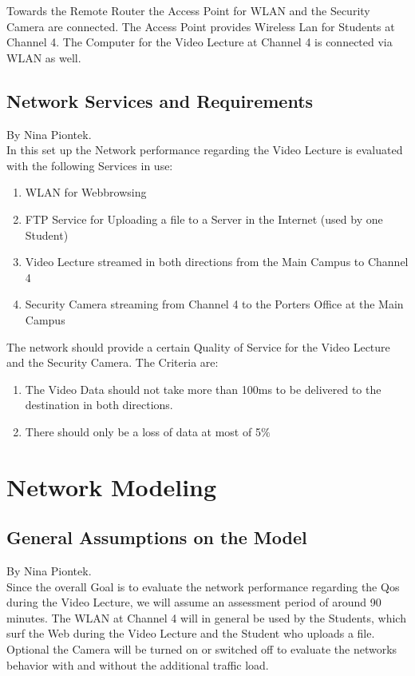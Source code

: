 \documentclass[a4paper,10pt]{book}\usepackage{graphicx}
\begin{document}
Towards the Remote Router the Access Point for WLAN and the Security Camera are connected.
The Access Point provides Wireless Lan for Students at Channel 4. The Computer for the Video Lecture at Channel 4 
is connected via WLAN as well.



\section{Network Services and Requirements}
By Nina Piontek.\\

In this set up the Network performance regarding the Video Lecture is evaluated with the following Services in
use:\\
\begin{enumerate}
 \item WLAN for Webbrowsing
 \item FTP Service for Uploading a file to a Server in the Internet (used by one Student) 
 \item Video Lecture streamed in both directions from the Main Campus to Channel 4
 \item Security Camera streaming from Channel 4 to the Porters Office  at the Main Campus
\end{enumerate}

The network should provide a certain Quality of Service for the Video Lecture and the Security Camera.
The Criteria are:\\
\begin{enumerate}
 \item The Video Data should not take more than 100ms to be delivered to the destination in both directions.
 \item There should only be a loss of data at most of 5$ \% $
\end{enumerate}

\chapter{Network Modeling}
\section{General Assumptions on the Model}
By Nina Piontek.\\

Since the overall Goal is to evaluate the network performance regarding the Qos during the Video Lecture, we will assume an assessment period
of around 90 minutes. The WLAN at Channel 4 will in general be used by the Students, which surf the Web during the Video Lecture and the Student 
who uploads a file. Optional the Camera will be turned on or switched off to evaluate the networks behavior with and without the additional
traffic load.
\end{document}
